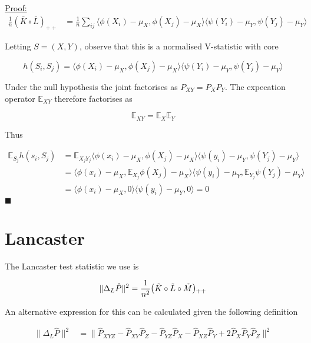\documentclass{article}
\newenvironment{claimproof}[1]{\par\noindent\underline{Proof:}\space#1}{\hfill $\blacksquare$}
\begin{document}
\begin{claimproof}[3]
\begin{align*}
\frac{1}{n}(\bar{K}\circ \bar{L})_{++} & = \frac{1}{n}\sum_{ij} \langle \phi(X_i) - \mu_X,\phi(X_j) -\mu_X \rangle \langle \psi(Y_i) - \mu_Y,\psi(Y_j) -\mu_Y \rangle 
\end{align*}

Letting $S=(X,Y)$, observe that this is a normalised V-statistic with core 

\[h(S_i,S_j) = \langle \phi(X_i) - \mu_X,\phi(X_j) -\mu_X \rangle \langle \psi(Y_i) - \mu_Y,\psi(Y_j) -\mu_Y \rangle \]

Under the null hypothesis the joint factorises as $P_{XY} = P_XP_Y$. The expecation operator $\mathbb{E}_{XY}$ therefore factorises as

\[\mathbb{E}_{XY} = \mathbb{E}_{X}\mathbb{E}_{Y}\]

Thus 

\begin{align*}
\mathbb{E}_{S_j}h(s_i,S_j) &= \mathbb{E}_{X_jY_j}\langle \phi(x_i) - \mu_X,\phi(X_j) -\mu_X \rangle \langle \psi(y_i) - \mu_Y,\psi(Y_j) -\mu_Y \rangle \\&=
\langle \phi(x_i) - \mu_X,\mathbb{E}_{X_j}\phi(X_j) -\mu_X \rangle  \langle \psi(y_i) - \mu_Y,\mathbb{E}_{Y_j}\psi(Y_j) -\mu_Y \rangle \\&=
\langle \phi(x_i) - \mu_X,0 \rangle  \langle \psi(y_i) - \mu_Y,0 \rangle = 0
\end{align*}
\end{claimproof}


\section{Lancaster}

The Lancaster test statistic we use is

\begin{align*}
\|\Delta_L \hat{P}\|^2 = \frac{1}{n^2}\mathlarger{(}\tilde{K}\circ\tilde{L}\circ\tilde{M}\mathlarger{)}_{++}
\end{align*}

An alternative expression for this can be calculated given the following definition

\begin{align*}
\|\Delta_L \hat{P}\|^2 & = \|\hat{P}_{XYZ}-\hat{P}_{XY}\hat{P}_{Z} -\hat{P}_{YZ}\hat{P}_{X} - \hat{P}_{XZ}\hat{P}_{Y} + 2\hat{P}_X\hat{P}_Y\hat{P}_Z \|^2 
\end{align*}
\end{document}
